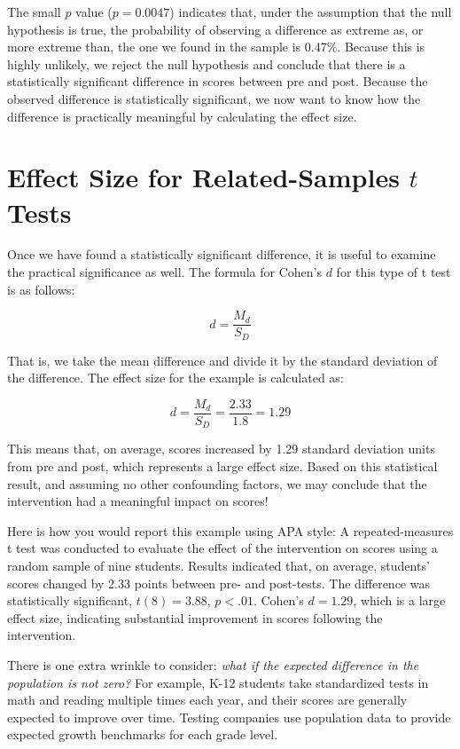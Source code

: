 \documentclass[
  letterpaper,
  DIV=11,
  numbers=noendperiod]{scrreprt}
\begin{document}
The small \(p\) value (\(p = 0.0047\)) indicates that, under the
assumption that the null hypothesis is true, the probability of
observing a difference as extreme as, or more extreme than, the one we
found in the sample is 0.47\%. Because this is highly unlikely, we
reject the null hypothesis and conclude that there is a statistically
significant difference in scores between pre and post. Because the
observed difference is statistically significant, we now want to know
how the difference is practically meaningful by calculating the effect
size.

\section{\texorpdfstring{Effect Size for Related-Samples \(t\)
Tests}{Effect Size for Related-Samples t Tests}}\label{effect-size-for-related-samples-t-tests}

Once we have found a statistically significant difference, it is useful
to examine the practical significance as well. The formula for Cohen's
\(d\) for this type of t test is as follows:

\[
d = \frac{M_d}{S_D}
\]

That is, we take the mean difference and divide it by the standard
deviation of the difference. The effect size for the example is
calculated as:

\[
d = \frac{M_d}{S_D} = \frac{2.33}{1.8} = 1.29
\]

This means that, on average, scores increased by 1.29 standard deviation
units from pre and post, which represents a large effect size. Based on
this statistical result, and assuming no other confounding factors, we
may conclude that the intervention had a meaningful impact on scores!

Here is how you would report this example using APA style: A
repeated-measures t test was conducted to evaluate the effect of the
intervention on scores using a random sample of nine students. Results
indicated that, on average, students' scores changed by 2.33 points
between pre- and post-tests. The difference was statistically
significant, \(t(8) = 3.88, \, p < .01\). Cohen's \(d = 1.29\), which is
a large effect size, indicating substantial improvement in scores
following the intervention.

There is one extra wrinkle to consider: \emph{what if the expected
difference in the population is not zero?} For example, K-12 students
take standardized tests in math and reading multiple times each year,
and their scores are generally expected to improve over time. Testing
companies use population data to provide expected growth benchmarks for
each grade level.
\end{document}
